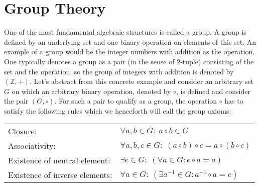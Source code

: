 \section{Group Theory} 
One of the most fundamental algebraic structures is called a group. A group is defined by an underlying set and one binary operation on elements of this set. An example of a group would be the integer numbers with addition as the operation. One typically denotes a group as a pair (in the sense of 2-tuple) consisting of the set and the operation, so the group of integers with addition is denoted by $(\mathbb{Z},+)$. Let's abstract from this concrete example and consider an arbitrary set $G$ on which an arbitrary binary operation, denoted by $\circ$, is defined and consider the pair $(G,\circ)$. For such a pair to qualify as a group, the operation $\circ$ has to satisfy the following rules which we henceforth will call the group axioms:

\medskip
\begin{tabular}{l l}
Closure: 
& $\forall a,b \in G: \; a \circ b \in G$  \\	
Associativity: 
& $\forall a,b,c \in G: \;  (a \circ b) \circ c = a \circ (b \circ c)$   \\
Existence of neutral element: 
& $\exists e \in G: \; (\forall a \in G: e \circ a = a)$ \\
Existence of inverse elements: 
& $\forall a \in G: \; (\exists a^{-1} \in G: a^{-1} \circ a = e )$ \\
\end{tabular}
\medskip

